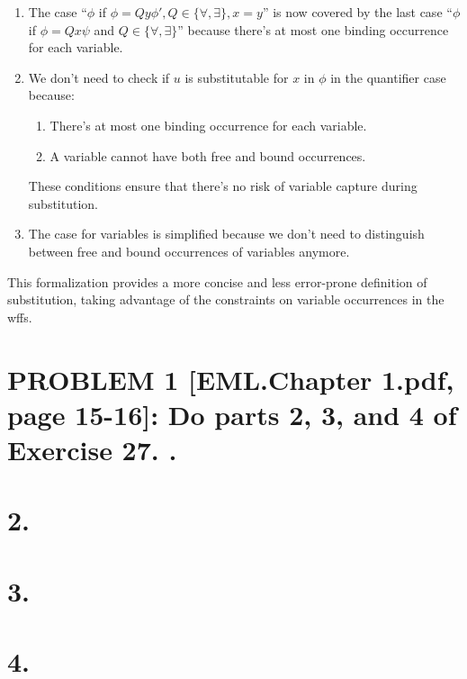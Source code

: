 \documentclass{article}
\begin{document}
\begin{enumerate}
    \item The case ``$\phi$ if $\phi = Qy \phi', Q \in \{\forall, \exists\}, x = y$'' is now covered by the last case ``$\phi$ if $\phi = Qx \psi$ and $Q \in \{\forall, \exists\}$'' because there's at most one binding occurrence for each variable.

    \item We don't need to check if $u$ is substitutable for $x$ in $\phi$ in the quantifier case because:
    \begin{enumerate}
        \item There's at most one binding occurrence for each variable.
        \item A variable cannot have both free and bound occurrences.
    \end{enumerate}
    These conditions ensure that there's no risk of variable capture during substitution.

    \item The case for variables is simplified because we don't need to distinguish between free and bound occurrences of variables anymore.
\end{enumerate}

This formalization provides a more concise and less error-prone definition of substitution, taking advantage of the constraints on variable occurrences in the wffs.

\newpage
\section*{PROBLEM 1 [EML.Chapter 1.pdf, page 15-16]: Do parts 2, 3, and 4 of Exercise 27. .}
\section*{2. }

\newpage

\section*{3.}

\newpage

\section*{4. }


\newpage
\end{document}
